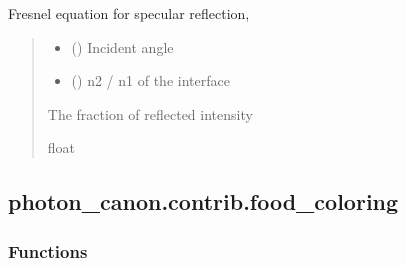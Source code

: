 \documentclass[letterpaper,10pt,english]{sphinxmanual}
\begin{document}
\begin{fulllineitems}
\label{\detokenize{generated/photon_canon.contrib.diffusion_theory:photon_canon.contrib.diffusion_theory.fresnel_equation}}
\pysigstartsignatures
\pysiglinewithargsret
{}
{\sphinxparamcomma {}}
{}
\pysigstopsignatures
\sphinxAtStartPar
Fresnel equation for specular reflection,
\begin{quote}\begin{description}
\begin{itemize}
\item {} 
\sphinxAtStartPar
{} () \textendash{} Incident angle

\item {} 
\sphinxAtStartPar
{} () \textendash{} n2 / n1 of the interface

\end{itemize}

\sphinxAtStartPar
The fraction of reflected intensity

\sphinxAtStartPar
float

\end{description}\end{quote}

\end{fulllineitems}


\sphinxstepscope


\subsection{photon\_canon.contrib.food\_coloring}
\label{\detokenize{generated/photon_canon.contrib.food_coloring:module-photon_canon.contrib.food_coloring}}\label{\detokenize{generated/photon_canon.contrib.food_coloring:photon-canon-contrib-food-coloring}}\label{\detokenize{generated/photon_canon.contrib.food_coloring::doc}}\subsubsection*{Functions}
\end{document}
